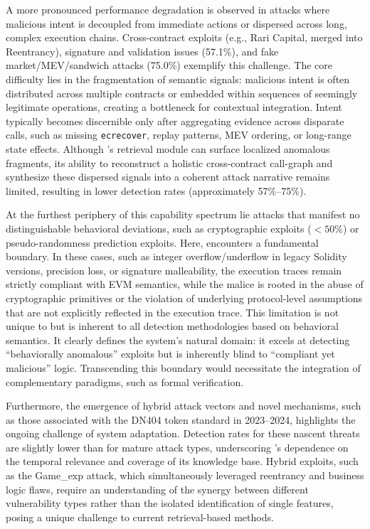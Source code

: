 A more pronounced performance degradation is observed in attacks where malicious intent is decoupled from immediate actions or dispersed across long, complex execution chains. Cross-contract exploits (e.g., Rari Capital, merged into Reentrancy), signature and validation issues (57.1\%), and fake market/MEV/sandwich attacks (75.0\%) exemplify this challenge. The core difficulty lies in the fragmentation of semantic signals: malicious intent is often distributed across multiple contracts or embedded within sequences of seemingly legitimate operations, creating a bottleneck for contextual integration. Intent typically becomes discernible only after aggregating evidence across disparate calls, such as missing \texttt{ecrecover}, replay patterns, MEV ordering, or long-range state effects. Although \approach{}’s retrieval module can surface localized anomalous fragments, its ability to reconstruct a holistic cross-contract call-graph and synthesize these dispersed signals into a coherent attack narrative remains limited, resulting in lower detection rates (approximately 57\%--75\%).


At the furthest periphery of this capability spectrum lie attacks that manifest no distinguishable behavioral deviations, such as cryptographic exploits ($<50\%$) or pseudo-randomness prediction exploits. Here, \approach{} encounters a fundamental boundary. In these cases, such as integer overflow/underflow in legacy Solidity versions, precision loss, or signature malleability, the execution traces remain strictly compliant with EVM semantics, while the malice is rooted in the abuse of cryptographic primitives or the violation of underlying protocol-level assumptions that are not explicitly reflected in the execution trace. This limitation is not unique to \approach{} but is inherent to all detection methodologies based on behavioral semantics. It clearly defines the system's natural domain: it excels at detecting ``behaviorally anomalous'' exploits but is inherently blind to ``compliant yet malicious'' logic. Transcending this boundary would necessitate the integration of complementary paradigms, such as formal verification.


Furthermore, the emergence of hybrid attack vectors and novel mechanisms, such as those associated with the DN404 token standard in 2023--2024, highlights the ongoing challenge of system adaptation. Detection rates for these nascent threats are slightly lower than for mature attack types, underscoring \approach{}’s dependence on the temporal relevance and coverage of its knowledge base. Hybrid exploits, such as the Game\_exp attack, which simultaneously leveraged reentrancy and business logic flaws, require an understanding of the synergy between different vulnerability types rather than the isolated identification of single features, posing a unique challenge to current retrieval-based methods.

